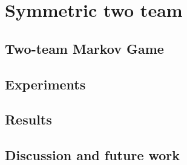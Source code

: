 \chapter{Symmetric two team}\label{ch:2teams}
\section{Two-team Markov Game}
\section{Experiments}
\section{Results}
\section{Discussion and future work}
